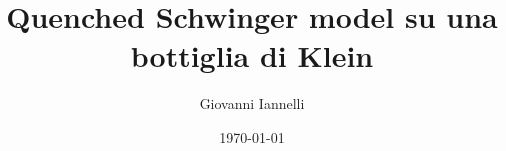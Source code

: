\title{Quenched Schwinger model su una bottiglia di Klein} %

\author{Giovanni Iannelli} %
\date{\today} %

\maketitle
